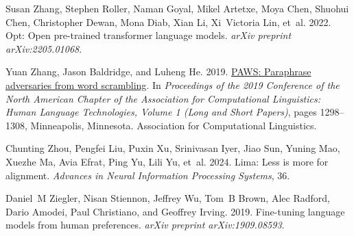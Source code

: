 \documentclass[11pt]{article}
\begin{document}
\begin{thebibliography}{88}
    Susan Zhang, Stephen Roller, Naman Goyal, Mikel Artetxe, Moya Chen, Shuohui Chen, Christopher Dewan, Mona Diab, Xian Li, Xi~Victoria Lin, et~al. 2022.
    \newblock Opt: Open pre-trained transformer language models.
    \newblock \emph{arXiv preprint arXiv:2205.01068}.
    
    Yuan Zhang, Jason Baldridge, and Luheng He. 2019.
    \newblock \href {https://doi.org/10.18653/v1/N19-1131} {{PAWS}: Paraphrase adversaries from word scrambling}.
    \newblock In \emph{Proceedings of the 2019 Conference of the North {A}merican Chapter of the Association for Computational Linguistics: Human Language Technologies, Volume 1 (Long and Short Papers)}, pages 1298--1308, Minneapolis, Minnesota. Association for Computational Linguistics.
    
    Chunting Zhou, Pengfei Liu, Puxin Xu, Srinivasan Iyer, Jiao Sun, Yuning Mao, Xuezhe Ma, Avia Efrat, Ping Yu, Lili Yu, et~al. 2024.
    \newblock Lima: Less is more for alignment.
    \newblock \emph{Advances in Neural Information Processing Systems}, 36.
    
    Daniel~M Ziegler, Nisan Stiennon, Jeffrey Wu, Tom~B Brown, Alec Radford, Dario Amodei, Paul Christiano, and Geoffrey Irving. 2019.
    \newblock Fine-tuning language models from human preferences.
    \newblock \emph{arXiv preprint arXiv:1909.08593}.
    
    \end{thebibliography}
    

\clearpage
\appendix

\label{sec:appendix}
\end{document}
